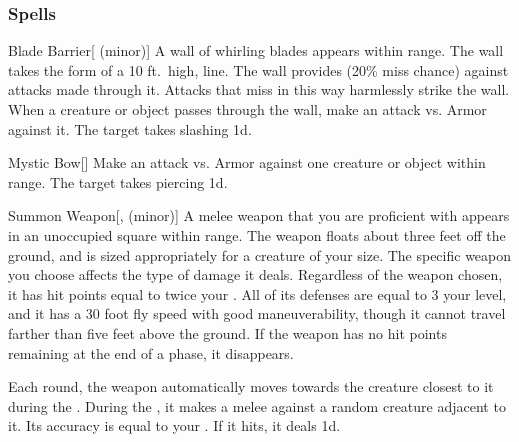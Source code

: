 \subsubsection{Spells}


\lowercase{\hypertarget{spell:Blade Barrier}{}}\label{spell:Blade Barrier}
\begin{freeability}[\nth{1}]{\hypertarget{spell:Blade Barrier}{Blade Barrier}}[ (minor)]
A wall of whirling blades appears within \rngmed range.
The wall takes the form of a 10 ft.\ high, \arealarge line.
The wall provides  (20\% miss chance) against attacks made through it.
Attacks that miss in this way harmlessly strike the wall.
When a creature or object passes through the wall, make an attack vs. Armor against it.
\hit The target takes slashing  \minus1d.
\end{freeability}
\vspace{0.25em}



\lowercase{\hypertarget{spell:Mystic Bow}{}}\label{spell:Mystic Bow}
\begin{freeability}[\nth{1}]{\hypertarget{spell:Mystic Bow}{Mystic Bow}}[]
Make an attack vs. Armor against one creature or object within \rngmed range.
\hit The target takes piercing  \plus1d.
\end{freeability}
\vspace{0.25em}



\lowercase{\hypertarget{spell:Summon Weapon}{}}\label{spell:Summon Weapon}
\begin{freeability}[\nth{1}]{\hypertarget{spell:Summon Weapon}{Summon Weapon}}[,  (minor)]
A melee weapon that you are proficient with appears in an unoccupied square within \rngmed range.
The weapon floats about three feet off the ground, and is sized appropriately for a creature of your size.
The specific weapon you choose affects the type of damage it deals.
Regardless of the weapon chosen, it has hit points equal to twice your .
All of its defenses are equal to 3 \add your level, and it has a 30 foot fly speed with good maneuverability, though it cannot travel farther than five feet above the ground.
If the weapon has no hit points remaining at the end of a phase, it disappears.

Each round, the weapon automatically moves towards the creature closest to it during the .
During the , it makes a melee  against a random creature adjacent to it.
Its accuracy is equal to your .
If it hits, it deals  \minus1d.
\end{freeability}
\vspace{0.25em}



